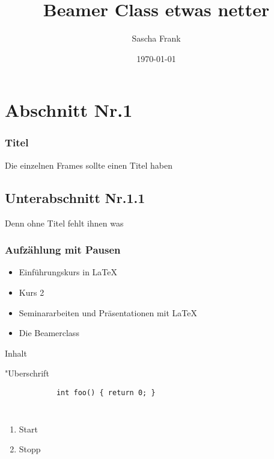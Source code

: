 \documentclass[hyperref={pdfpagelabels=false}]{beamer}
\title{Beamer Class etwas netter}
\author{Sascha Frank}
\date{\today}
\begin{document}
\begin{frame}
\titlepage
\end{frame} 

\section{Abschnitt Nr.1} 
\begin{frame}
\frametitle{Titel} 
Die einzelnen Frames sollte einen Titel haben 
\end{frame}

\subsection{Unterabschnitt Nr.1.1  }
\begin{frame} 
Denn ohne Titel fehlt ihnen was
\end{frame}

\begin{frame}
\frametitle{Aufz\"ahlung mit Pausen}
\begin{itemize}[<+->]
\item  Einf\"uhrungskurs in \LaTeX{} 
\item  Kurs 2 
\item  Seminararbeiten und Pr\"asentationen mit \LaTeX{} 
\item  Die Beamerclass
\end{itemize} 
\end{frame}

	\begin{frame}
		Inhalt
	\end{frame}
	
	\begin{frame}[fragile]{"Uberschrift}
		\begin{verbatim}
			int foo() { return 0; }
		\end{verbatim}
	\end{frame}


	
	\begin{columns}
	                \begin{enumerate}
	                \item Start
	                \item Stopp
	                \end{enumerate}
	                
	        
	\end{columns}
	
\end{document}
